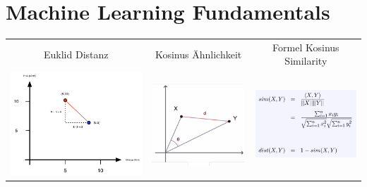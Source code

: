 \documentclass{article}
\begin{document}
\section{Machine Learning Fundamentals}
	\begin{tabular}{c c c}
	  Euklid Distanz & Kosinus Ähnlichkeit & Formel Kosinus Similarity\\
    	  \includegraphics[width=0.25\linewidth]{euclide_distance.png} & \includegraphics[width=0.25\linewidth]{cosine_similarity.png} & \includegraphics[width=0.25\linewidth]{cosine_similarity_formula.png} \\
	\end{tabular}
\end{document}
